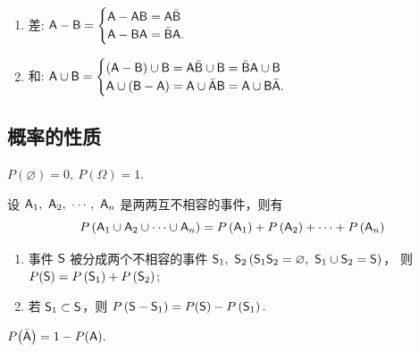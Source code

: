 \begin{theorem}[和差转换]
    \begin{enumerate}[label=(\arabic{*})]
        \item 差: $\mathsf{A}-\mathsf{B}=\begin{cases}
                      \mathsf{A}-\mathsf{A} \mathsf{B}=\mathsf{A} \bar{\mathsf{B}} \\ \mathsf{A}-\mathsf{B} \mathsf{A}=\bar{\mathsf{B}} \mathsf{A}.
                  \end{cases}$
        \item 和: $\mathsf{A} \cup \mathsf{B}=\begin{cases}
                      (\mathsf{A}-\mathsf{B}) \cup \mathsf{B}=\mathsf{A} \bar{\mathsf{B}} \cup \mathsf{B}=\bar{\mathsf{B}} \mathsf{A} \cup \mathsf{B} \\ \mathsf{A} \cup(\mathsf{B}-\mathsf{A})=\mathsf{A} \cup \bar{\mathsf{A}} \mathsf{B}=\mathsf{A} \cup \mathsf{B} \bar{\mathsf{A}}.
                  \end{cases}$
    \end{enumerate}
\end{theorem}

\subsection{概率的性质}

\begin{theorem}
    $P(\varnothing)=0,~ P(\Omega)=1 .$
\end{theorem}

\begin{theorem}[有限可加性]
    设 $ \mathsf{A}_{1},~\mathsf{A}_{2},~\cdots,~\mathsf{A}_{n} $ 是两两互不相容的事件，则有
    $$P\left(\mathsf{A}_{1} \cup \mathsf{A}_{2} \cup \cdots \cup \mathsf{A}_{n}\right)=P\left(\mathsf{A}_{1}\right)+P\left(\mathsf{A}_{2}\right)+\cdots+P\left(\mathsf{A}_{n}\right)$$
    \begin{enumerate}[label=(\arabic{*})]
        \item 事件 $\mathsf{S}$ 被分成两个不相容的事件 $\mathsf{S}_{1},~\mathsf{S}_{2}\left(\mathsf{S}_{1} \mathsf{S}_{2}=\varnothing,~\mathsf{S}_{1} \cup \mathsf{S}_{2}=\mathsf{S}\right)$，
        则 $ P(\mathsf{S})=P\left(\mathsf{S}_{1}\right)+P\left(\mathsf{S}_{2}\right)$;
        \item 若 $ \mathsf{S}_{1} \subset \mathsf{S}$，则 $ P\left(\mathsf{S}-\mathsf{S}_{1}\right)=P(\mathsf{S})-P\left(\mathsf{S}_{1}\right).$
    \end{enumerate}
\end{theorem}

\begin{theorem}[求逆公式]
    $P\qty(\bar{\mathsf{A}})=1-P(\mathsf{A}).$
\end{theorem}

